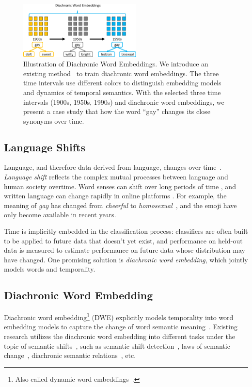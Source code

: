 \begin{figure}[tb!]
\centering
\includegraphics[width=0.55\textwidth]{images/chapter2/diachronic.pdf}
\caption{Illustration of Diachronic Word Embeddings. We introduce an existing method~\cite{kulkarni2015statistically} to train diachronic word embeddings. The three time intervals use different colors to distinguish embedding models and dynamics of temporal semantics. With the selected three time intervals (1900s, 1950s, 1990s) and diachronic word embeddings, we present a case study that how the word ``gay'' changes its close synonyms over time.}
\label{chap2:fig:diachronic}
\end{figure}

\subsection{Language Shifts}

Language, and therefore data derived from language, changes over time~\cite{Ullmann62}.
\textit{Language shift} reflects the complex mutual processes between language and human society overtime.
Word senses can shift over long periods of time \cite{hamilton2016diachronic}, and written language can change rapidly in online platforms \cite{eisenstein2014diffusion, goel2016social}.
For example, the meaning of \textit{gay} has changed from \textit{cheerful} to \textit{homosexual}~\cite{hamilton2016diachronic}, and the emoji have only become available in recent years. 

Time is implicitly embedded in the classification process: classifiers are often built to be applied to future data that doesn't yet exist, and performance on held-out data is measured to estimate performance on future data whose distribution may have changed.
One promising solution is \textit{diachronic word embedding}, which jointly models words and temporality.


\subsection{Diachronic Word Embedding}

Diachronic word embedding\footnote{Also called dynamic word embeddings~\cite{yao2018dynamic}.} (DWE) explicitly models temporality into word embedding models to capture the change of word semantic meaning~\cite{kutuzov2018diachronic}.
Existing research utilizes the diachronic word embedding into different tasks under the topic of semantic shifts~\cite{kutuzov2018diachronic}, such as semantic shift detection~\cite{mihalcea2012word, kim2014temporal, kulkarni2015statistically, rudolph2018dynamic, yao2018dynamic, rosenfeld2018deep}, laws of semantic change~\cite{hamilton2016diachronic, dubossarsky2017outta}, diachronic semantic relations~\cite{rosin2017learning, szymanski2017temporal}, etc.

